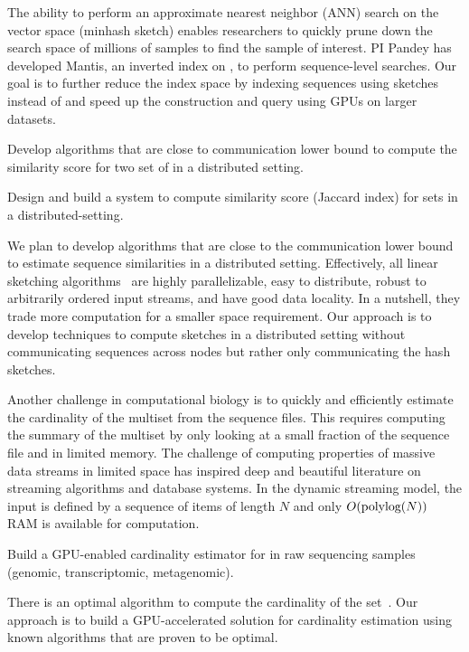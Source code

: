 The ability to perform an approximate nearest neighbor (ANN) search on the vector space (minhash sketch) enables researchers to quickly prune down the search space of millions of samples to find the sample of interest. PI Pandey has developed Mantis, an inverted index on \kmers, to perform sequence-level searches. Our goal is to further reduce the index space by indexing sequences using sketches instead of \kmers and speed up the construction and query using GPUs on larger datasets.

\begin{rproblem}
Develop algorithms that are close to communication lower bound to compute the similarity score for two set of \kmers in a distributed setting.
\end{rproblem}

\begin{rproblem}
Design and build a system to compute similarity score (Jaccard index) for \kmer sets in a distributed-setting.
\end{rproblem}

We plan to develop algorithms that are close to the communication lower bound to estimate sequence similarities in a distributed setting. Effectively, all linear sketching algorithms~\cite{li2014sketchuniversal} are highly parallelizable, easy to distribute, robust to arbitrarily ordered input streams, and have good data locality. In a nutshell, they trade more computation for a smaller space requirement. Our approach is to develop techniques to compute sketches in a distributed setting without communicating sequences across nodes but rather only communicating the hash sketches.

Another challenge in computational biology is to quickly and efficiently estimate the cardinality of the \kmer multiset from the sequence files. This requires computing the summary of the \kmer multiset by only looking at a small fraction of the sequence file and in limited memory.
%
The challenge of computing properties of massive data streams in limited space has inspired deep and beautiful literature on streaming algorithms and database systems. In the dynamic streaming model, the input is defined by a sequence of items of length $N$ and only $O(\textrm{polylog}{(N)})$ {RAM} is available for computation.


\begin{rproblem}
Build a GPU-enabled cardinality estimator for \kmers in raw sequencing samples (genomic, transcriptomic, metagenomic).
\end{rproblem}

There is an optimal algorithm to compute the cardinality of the set~\cite{Kane2010}.
Our approach is to build a GPU-accelerated solution for cardinality estimation using known algorithms that are proven to be optimal.
